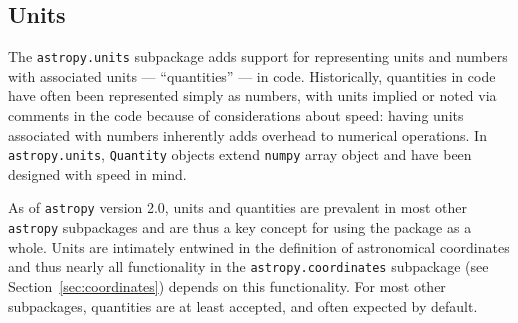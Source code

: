 \documentclass[modern]{aastex61}
\newcommand{\package}[1]{\texttt{#1}\xspace}
\newcommand{\astropypkg}{\package{astropy}}
\newcommand{\sectionname}{Section\xspace}
\newcommand{\inlinecomment}[2]{\todo[inline]{#1: #2}\xspace}
\begin{document}

\subsection{Units}\label{sec:units}

The \texttt{astropy.units} subpackage adds support for representing units and
numbers with associated units --- ``quantities'' --- in code.
Historically, quantities in code have often been represented simply as numbers,
with units implied or noted via comments in the code because of considerations
about speed: having units associated with numbers inherently adds overhead to
numerical operations.
In \texttt{astropy.units}, \texttt{Quantity} objects extend \texttt{numpy}
array object and have been designed with speed in mind.


As of \astropypkg version 2.0, units and quantities are prevalent in most other
\astropypkg subpackages and are thus a key concept for using the package as a
whole.
Units are intimately entwined in the definition of astronomical coordinates and
thus nearly all functionality in the \texttt{astropy.coordinates} subpackage
(see \sectionname~\ref{sec:coordinates}) depends on this functionality.
For most other subpackages, quantities are at least accepted, and often expected
by default.
\end{document}
